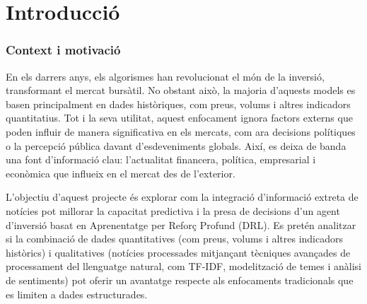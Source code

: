 \documentclass[12pt,a4paper,twoside]{book}
\begin{document}
\renewcommand{\thesection}{\thechapter} %



\newpage

\newpage

\pagestyle{fancy}
\renewcommand{\chaptermark}[1]{ \markboth{#1}{}}
\renewcommand{\sectionmark}[1]{\markright{ \thesection.\ #1}}
\lhead[\fancyplain{}{\bfseries\thepage}]{\fancyplain{}{\bfseries\rightmark}}
\rhead[\fancyplain{}{\bfseries\leftmark}]{\fancyplain{}{\bfseries\thepage}}
\cfoot{}

\cleardoublepage
{}
{}
\tableofcontents
\cleardoublepage
{}
{}
\listoffigures


\thispagestyle{empty}


\pagestyle{fancy}
\renewcommand{\chaptermark}[1]{ \markboth{#1}{}}
\renewcommand{\sectionmark}[1]{\markright{ \thesection.\ #1}}
\lhead[\fancyplain{}{\bfseries\thepage}]{\fancyplain{}{\bfseries\rightmark}}
\rhead[\fancyplain{}{\bfseries\leftmark}]{\fancyplain{}{\bfseries\thepage}}
\cfoot{}

\onehalfspacing

\chapter{Introducció}

\subsection{Context i motivació}
\sloppy

En els darrers anys, els algorismes han revolucionat el món de la inversió, transformant el mercat bursàtil. No obstant això, la majoria d’aquests models es basen principalment en dades històriques, com preus, volums i altres indicadors quantitatius. Tot i la seva utilitat, aquest enfocament ignora factors externs que poden influir de manera significativa en els mercats, com ara decisions polítiques o la percepció pública davant d’esdeveniments globals. Així, es deixa de banda una font d’informació clau: l’actualitat financera, política, empresarial i econòmica que influeix en el mercat des de l’exterior.

L’objectiu d’aquest projecte és explorar com la integració d’informació extreta de notícies pot millorar la capacitat predictiva i la presa de decisions d’un agent d’inversió basat en Aprenentatge per Reforç Profund (DRL). Es pretén analitzar si la combinació de dades quantitatives (com preus, volums i altres indicadors històrics) i qualitatives (notícies processades mitjançant tècniques avançades de processament del llenguatge natural, com TF-IDF, modelització de temes i anàlisi de sentiments) pot oferir un avantatge respecte als enfocaments tradicionals que es limiten a dades estructurades.
\end{document}
